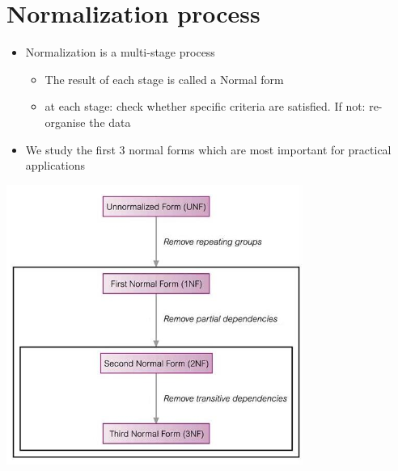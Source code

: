 \documentclass{article}[18pt]
\begin{document}
\section{Normalization process}
\begin{itemize}
	\item Normalization is a multi-stage process
	\begin{itemize}
		\item The result of each stage is called a Normal form
		\item at each stage: check whether specific criteria are satisfied. If not: re-organise the data
	\end{itemize}
	\item We study the first 3 normal forms which are most important for practical applications
\end{itemize}
\begin{center}
	\includegraphics[scale=0.7]{"Normal Forms"}
\end{center}
\end{document}
